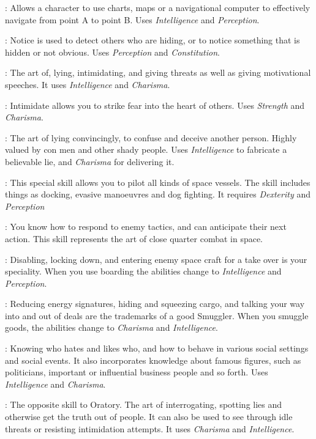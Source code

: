 : Allows a character to use charts, maps or a navigational
computer to effectively navigate from point A to point B. Uses
\emph{Intelligence} and \emph{Perception}.

: Notice is used to detect others who are hiding, or to notice
something that is hidden or not obvious. Uses \emph{Perception} and
\emph{Constitution}.

: The art of, lying, intimidating, and giving threats as well
as giving motivational speeches. It uses \emph{Intelligence} and 
\emph{Charisma}.

: Intimidate allows you to strike
fear into the heart of others. Uses \emph{Strength} and \emph{Charisma}.

: The art of lying convincingly,
to confuse and deceive another person. Highly valued by con men and other
shady people. Uses \emph{Intelligence} to fabricate a believable lie, and
\emph{Charisma} for delivering it.

: This special skill allows you to pilot all
kinds of space vessels. The skill includes things as docking, evasive
manoeuvres and dog fighting. It requires \emph{Dexterity} and
\emph{Perception}

: You know how to respond to
enemy tactics, and can anticipate their next action. This skill represents the
art of close quarter combat in space.

: Disabling, locking down, and
entering enemy space craft for a take over is your speciality. When you use
boarding the abilities change to \emph{Intelligence} and \emph{Perception}.

: Reducing energy signatures,
hiding and squeezing cargo, and talking your way into and out of deals are the
trademarks of a good Smuggler. When you smuggle goods, the abilities change to
\emph{Charisma} and \emph{Intelligence}.

: Knowing who hates and likes who, and how to behave in
various social settings and social events. It also incorporates knowledge about
famous figures, such as politicians, important or influential business people
and so forth. Uses \emph{Intelligence} and \emph{Charisma}.

: The opposite skill to Oratory. The art of interrogating,
spotting lies and otherwise get the truth out of people. It can also be used
to see through idle threats or resisting intimidation attempts. It uses
\emph{Charisma} and \emph{Intelligence}.

